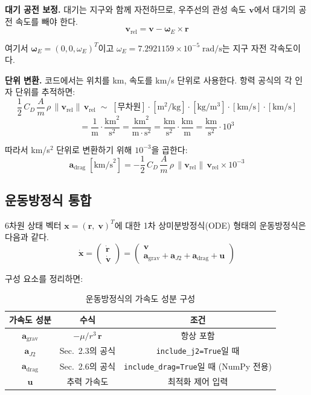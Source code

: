 \documentclass[11pt]{article}
\begin{document}
\textbf{대기 공전 보정.} 대기는 지구와 함께 자전하므로, 우주선의 관성 속도 $\mathbf{v}$에서 대기의 공전 속도를 빼야 한다.
\[
\mathbf{v}_{\text{rel}} = \mathbf{v} - \boldsymbol{\omega}_E \times \mathbf{r}
\]

여기서 $\boldsymbol{\omega}_E = (0, 0, \omega_E)^T$이고 $\omega_E = 7.2921159 \times 10^{-5}\;\text{rad/s}$는 지구 자전 각속도이다.

\textbf{단위 변환.} 코드에서는 위치를 km, 속도를 km/s 단위로 사용한다. 항력 공식의 각 인자 단위를 추적하면:
\[
\frac{1}{2}\,C_D\,\frac{A}{m}\,\rho\,\|\mathbf{v}_{\text{rel}}\|\,\mathbf{v}_{\text{rel}} \;\sim\; [\text{무차원}]\cdot[\text{m}^2/\text{kg}]\cdot[\text{kg}/\text{m}^3]\cdot[\text{km}/\text{s}]\cdot[\text{km}/\text{s}]
\]
\[
= \frac{1}{\text{m}}\cdot\frac{\text{km}^2}{\text{s}^2} = \frac{\text{km}^2}{\text{m}\cdot\text{s}^2} = \frac{\text{km}}{\text{s}^2}\cdot\frac{\text{km}}{\text{m}} = \frac{\text{km}}{\text{s}^2}\cdot 10^3
\]

따라서 km/s$^2$ 단위로 변환하기 위해 $10^{-3}$을 곱한다:
\[
\mathbf{a}_{\text{drag}}\;[\text{km/s}^2] = -\frac{1}{2}\,C_D\,\frac{A}{m}\,\rho\,\|\mathbf{v}_{\text{rel}}\|\,\mathbf{v}_{\text{rel}} \times 10^{-3}
\]


\subsection{운동방정식 통합}

6차원 상태 벡터 $\mathbf{x} = (\mathbf{r},\;\mathbf{v})^T$에 대한 1차 상미분방정식(ODE) 형태의 운동방정식은 다음과 같다.
\[
\dot{\mathbf{x}} = \begin{pmatrix} \dot{\mathbf{r}} \\ \dot{\mathbf{v}} \end{pmatrix} = \begin{pmatrix} \mathbf{v} \\ \mathbf{a}_{\text{grav}} + \mathbf{a}_{J2} + \mathbf{a}_{\text{drag}} + \mathbf{u} \end{pmatrix}
\]

구성 요소를 정리하면:

\begin{table}[h]
\centering
\caption{운동방정식의 가속도 성분 구성}
\label{tab:accel_components}
\begin{tabular}{ccc}
\toprule
가속도 성분 & 수식 & 조건 \\
\midrule
$\mathbf{a}_{\text{grav}}$ & $-\mu/r^3\,\mathbf{r}$ & 항상 포함 \\
$\mathbf{a}_{J2}$ & Sec.~2.3의 공식 & \texttt{include\_j2=True}일 때 \\
$\mathbf{a}_{\text{drag}}$ & Sec.~2.6의 공식 & \texttt{include\_drag=True}일 때 (NumPy 전용) \\
$\mathbf{u}$ & 추력 가속도 & 최적화 제어 입력 \\
\bottomrule
\end{tabular}
\end{table}
\end{document}
